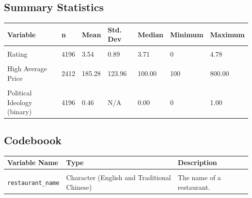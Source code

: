 \documentclass[letterpaper, 12pt]{article}
\begin{document}
\begin{appendices}
\subsection{Summary Statistics}
\begingroup
\begin{longtable}[c]{lllllll}
\toprule
\textbf{Variable} & \textbf{n} & \textbf{Mean} & \textbf{Std. Dev} & \textbf{Median} & \textbf{Minimum} & \textbf{Maximum}\\
\midrule
\cellcolor{gray!6}{Store Status (binary)} & \cellcolor{gray!6}{4196} & \cellcolor{gray!6}{0.71} & \cellcolor{gray!6}{N/A} & \cellcolor{gray!6}{1.00} & \cellcolor{gray!6}{0} & \cellcolor{gray!6}{1.00}\\
Rating & 4196 & 3.54 & 0.89 & 3.71 & 0 & 4.78\\
\cellcolor{gray!6}{Low Average Price} & \cellcolor{gray!6}{4179} & \cellcolor{gray!6}{75.19} & \cellcolor{gray!6}{51.79} & \cellcolor{gray!6}{51.00} & \cellcolor{gray!6}{50} & \cellcolor{gray!6}{401.00}\\
High Average Price & 2412 & 185.28 & 123.96 & 100.00 & 100 & 800.00\\
\cellcolor{gray!6}{Chain Store (binary)} & \cellcolor{gray!6}{4196} & \cellcolor{gray!6}{0.34} & \cellcolor{gray!6}{N/A} & \cellcolor{gray!6}{0.00} & \cellcolor{gray!6}{0} & \cellcolor{gray!6}{1.00}\\
Political Ideology (binary) & 4196 & 0.46 & N/A & 0.00 & 0 & 1.00\\
\bottomrule
\end{longtable}
\endgroup{}




\subsection{Codeboook}
\begin{table}[h!]
\fontsize{11}{12}\selectfont
\setlength\extrarowheight{2pt} %
\begin{tabularx}{\textwidth}{CCC}
\toprule
\textbf{Variable Name} & \textbf{Type} & \textbf{Description}  \\
\midrule
{} &  &   \\

\texttt{restaurant\_name} & Character (English and Traditional Chinese) & The name of a restaurant.  \\


\end{tabularx}
\end{table}
\end{appendices}
\end{document}
